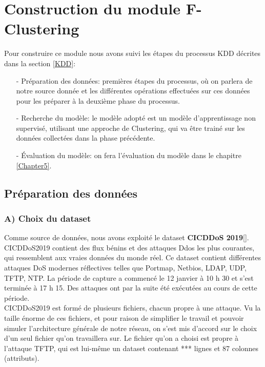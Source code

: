 \section{Construction du module F-Clustering}
\label{F-Clustering}
Pour construire ce module nous avons suivi les étapes du processus KDD décrites dans la section \ref{KDD}:\\
\begin{itemize}
\item[-] Préparation des données: premières étapes du processus, où on parlera de notre source donnée et les différentes opérations effectuées sur ces données pour les préparer à la deuxième phase du processus. \\
\item[-] Recherche du modèle: le modèle adopté est un modèle d'apprentissage non supervisé, utilisant une approche de Clustering, qui va être trainé sur les données collectées dans la phase précédente.\\
\item[-] Évaluation du modèle: on fera l'évaluation du modèle dans le chapitre \ref{Chapter5}.
\end{itemize}

\subsection{Préparation des données}
\subsubsection{A) Choix du dataset }
Comme source de données, nous avons exploité le dataset \textbf{ CICDDoS 2019}[\cite{18}]. CICDDoS2019 contient des flux bénins et des attaques Ddos les plus courantes, qui ressemblent aux vraies données du monde réel. Ce dataset contient différentes attaques DoS modernes réflectives telles que Portmap, Netbios, LDAP, UDP, TFTP, NTP. La période de capture a commencé le 12 janvier à 10 h 30 et s’est terminée à 17 h 15. Des attaques ont par la suite été exécutées au cours de cette période. \\

CICDDoS2019 est formé de plusieurs fichiers, chacun propre à une attaque. Vu la taille énorme de ces fichiers, et pour raison de simplifier le travail et pouvoir simuler l'architecture générale de notre réseau, on s'est mis d'accord sur le choix d'un seul fichier qu'on travaillera sur. Le fichier qu'on a choisi est propre à l'attaque TFTP, qui est lui-même un dataset contenant *** lignes et 87 colonnes (attributs).\\

